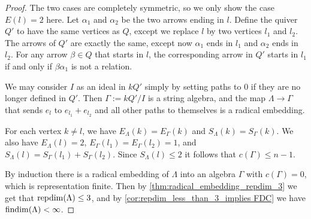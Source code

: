 \begin{theorem}
\begin{proof}
		The two cases are completely symmetric, so we only show the case $E(l)=2$ here. Let $\alpha_1$ and $\alpha_2$ be the two arrows ending in $l$. Define the quiver $Q'$ to have the same vertices as $Q$, except we replace $l$ by two vertices $l_1$ and $l_2$. The arrows of $Q'$ are exactly the same, except now $\alpha_1$ ends in $l_1$ and $\alpha_2$ ends in $l_2$. For any arrow $\beta \in Q$ that starts in $l$, the corresponding arrow in $Q'$ starts in $l_1$ if and only if $\beta\alpha_1$ is not a relation.

		We may consider $I$ as an ideal in $kQ'$ simply by setting paths to 0 if they are no longer defined in $Q'$. Then $\Gamma := kQ'/I$ is a string algebra, and the map $\Lambda \to \Gamma$ that sends $e_l$ to $e_{l_1}+e_{l_2}$ and all other paths to themselves is a radical embedding.

		For each vertex $k \neq l$, we have $E_\Lambda(k) = E_\Gamma(k)$ and $S_\Lambda(k) = S_\Gamma(k)$. We also have $E_\Lambda(l) = 2$,  $E_\Gamma(l_1) = E_\Gamma(l_2) = 1$, and $S_\Lambda(l) = S_\Gamma(l_1)+S_\Gamma(l_2)$. Since $S_\Lambda(l) \leq 2$ it follows that $c(\Gamma) \leq n-1$.

		By induction there is a radical embedding of $\Lambda$ into an algebra $\Gamma$ with $c(\Gamma)=0$, which is representation finite. Then by \cref{thm:radical_embedding_repdim_3} we get that $\operatorname{repdim}(\Lambda) \leq 3$, and by \cref{cor:repdim_less_than_3_implies FDC} we have $\operatorname{findim}(\Lambda) < \infty$.
	\end{proof}
\end{theorem}